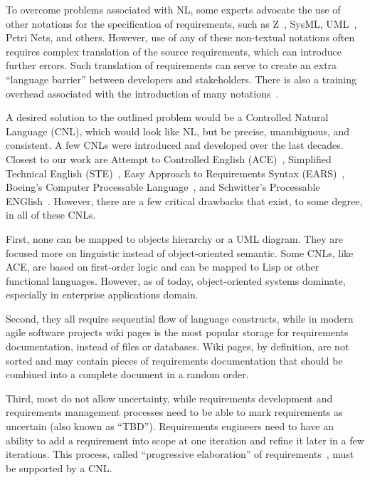 \documentclass[conference]{IEEEtran}
\newcommand{\nospell}[1]{#1}
\begin{document}
To overcome problems associated with NL, some experts advocate the use of
other notations for the specification of requirements, such as
Z~\cite{woodcock96}, SysML, UML~\cite{uml}, Petri Nets, and others. However,
use of any of these non-textual notations often requires complex translation
of the source requirements, which can introduce further errors. Such
translation of requirements can serve to create an extra ``language
barrier'' between developers and stakeholders. There is also a training
overhead associated with the introduction of many notations~\cite{ears09}.

A desired solution to the outlined problem would be a Controlled Natural
Language (CNL), which would look like NL, but be precise,
unambiguous, and consistent. A few CNLs were introduced and developed over
the last decades. Closest to our work are Attempt to Controlled English
(ACE)~\cite{ace06}, Simplified Technical English (STE)~\cite{ste05}, Easy
Approach to Requirements Syntax (EARS)~\cite{ears09}, Boeing's Computer
Processable Language~\cite{clark05}, and \nospell{Schwitter's Processable
ENGlish}~\cite{peng}. However, there are a few critical drawbacks that exist,
to some degree, in all of these CNLs.

First, none can be mapped to objects hierarchy or a UML diagram.
They are focused more on linguistic instead of object-oriented semantic.
Some CNLs, like ACE, are based on first-order logic and can be mapped to
Lisp or other functional languages. However, as of today, object-oriented
systems dominate, especially in enterprise applications domain.

Second, they all require sequential flow of language constructs, while in
modern agile software projects wiki pages is the most popular storage for
requirements documentation, instead of files or databases. Wiki pages, by
definition, are not sorted and may contain pieces of requirements
documentation that should be combined into a complete document in a random
order.

Third, most do not allow uncertainty, while requirements development
and requirements management processes need to be able to mark
requirements as uncertain (also known as ``TBD''). Requirements engineers
need to have an ability to add a requirement into scope at one iteration
and refine it later in a few iterations. This process, called ``progressive
elaboration'' of requirements~\cite{pmbok4}, must be supported by a CNL.
\end{document}
